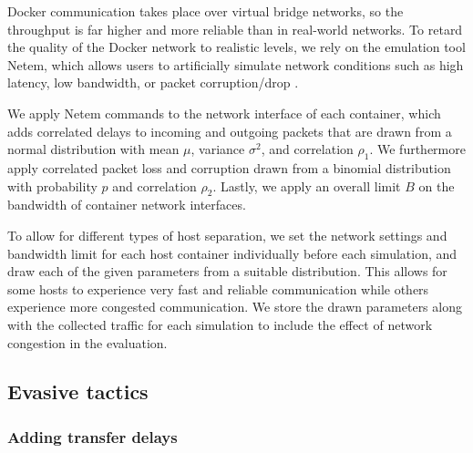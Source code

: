 \documentclass[runningheads,11pt]{llncs}\usepackage[]{graphicx}\usepackage[]{color}
\begin{document}
Docker communication takes place over virtual bridge networks, so the throughput is far higher and more reliable than in real-world networks. %
To retard the quality of the Docker network to realistic levels, we rely on the emulation tool Netem, which allows users to artificially simulate network conditions such as high latency, low bandwidth, or packet corruption/drop \cite{hemminger2005network}.

We apply Netem commands to the network interface of each container, which adds correlated delays to incoming and outgoing packets that are drawn from a normal distribution with mean $\mu$, variance $\sigma^2$, and correlation $\rho_1$. We furthermore apply correlated packet loss and corruption drawn from a binomial distribution with probability $p$ and correlation $\rho_2$. Lastly, we apply an overall limit $B$ on the bandwidth of container network interfaces.

To allow for different types of host separation, we set the network settings and bandwidth limit for each host container individually before each simulation, and draw each of the given parameters from a suitable distribution. This allows for some hosts to experience very fast and reliable communication while others experience more congested communication. %
We store the drawn parameters along with the collected traffic for each simulation to include the effect of network congestion in the evaluation. 







\subsection{Evasive tactics}

\subsubsection{Adding transfer delays}\label{Sec:delays_desc}
\end{document}
